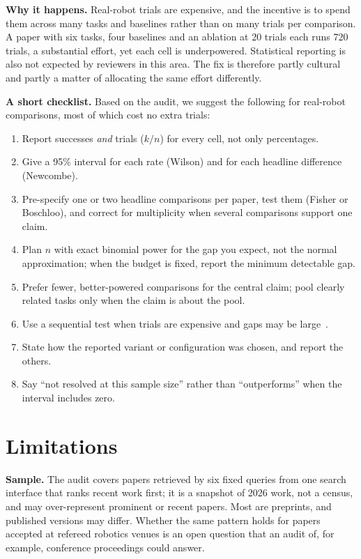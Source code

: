 \documentclass[11pt]{article}
\begin{document}
\textbf{Why it happens.} Real-robot trials are expensive, and the incentive is to spend them across many tasks and baselines rather than on many trials per comparison. A paper with six tasks, four baselines and an ablation at 20 trials each runs 720 trials, a substantial effort, yet each cell is underpowered. Statistical reporting is also not expected by reviewers in this area. The fix is therefore partly cultural and partly a matter of allocating the same effort differently.

\textbf{A short checklist.} Based on the audit, we suggest the following for real-robot comparisons, most of which cost no extra trials:
\begin{enumerate}[leftmargin=*,itemsep=1pt]
\item Report successes \emph{and} trials ($k/n$) for every cell, not only percentages.
\item Give a 95\% interval for each rate (Wilson) and for each headline difference (Newcombe).
\item Pre-specify one or two headline comparisons per paper, test them (Fisher or Boschloo), and correct for multiplicity when several comparisons support one claim.
\item Plan $n$ with exact binomial power for the gap you expect, not the normal approximation; when the budget is fixed, report the minimum detectable gap.
\item Prefer fewer, better-powered comparisons for the central claim; pool clearly related tasks only when the claim is about the pool.
\item Use a sequential test when trials are expensive and gaps may be large~\cite{snyder2025step}.
\item State how the reported variant or configuration was chosen, and report the others.
\item Say ``not resolved at this sample size'' rather than ``outperforms'' when the interval includes zero.
\end{enumerate}

\section{Limitations}
\textbf{Sample.} The audit covers papers retrieved by six fixed queries from one search interface that ranks recent work first; it is a snapshot of 2026 work, not a census, and may over-represent prominent or recent papers. Most are preprints, and published versions may differ. Whether the same pattern holds for papers accepted at refereed robotics venues is an open question that an audit of, for example, conference proceedings could answer.
\end{document}
